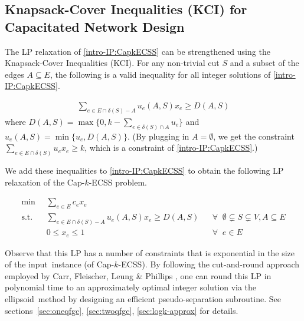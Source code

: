 \documentclass[11pt]{article}
\begin{document}
\subsection*{Knapsack-Cover Inequalities (KCI) for Capacitated Network Design}
{
The LP relaxation of \eqref{intro-IP:CapkECSS} can be strengthened
using the Knapsack-Cover Inequalities (KCI). For any non-trivial
cut $S$ and a subset of the edges $A\subseteq E$, the following is
a valid inequality for all integer solutions of \eqref{intro-IP:CapkECSS}.

\begin{align*}
        \sum_{e\in E\cap\delta(S) - A} u_e(A,S) x_e \geq D(A,S)
\end{align*}
where $D(A,S) = \max\{0,k - \sum_{e\in \delta(S)\cap A} u_e\}$ and
$u_e(A,S) = \min\{u_e,D(A,S)\}$.
(By plugging in $A=\emptyset$, we get the constraint
$\sum_{e\in E\cap\delta(S)} u_e x_e \geq k$,
which is a constraint of \eqref{intro-IP:CapkECSS}.)

We add these inequalities to \eqref{intro-IP:CapkECSS} to obtain the
following LP relaxation of the Cap-$k$-ECSS problem.

\begin{align*}\label{intro-KCLP:CapkECSS}
    \min\;\;&\sum_{e\in E}c_e x_e \tag{KCLP:~CapkECSS}\\
    \text{s.t.}\;\;& \sum_{e\in E\cap\delta(S) - A} u_e(A,S) x_e \geq D(A,S) && \forall\;\; \emptyset\subsetneq S\subsetneq V, A\subseteq E \\
    &0 \leq x_e \leq 1 && \forall\;\; e\in E
\end{align*}

Observe that this LP has a number of constraints that is exponential
in the size of the input~instance (of Cap-$k$-ECSS).
By following the cut-and-round approach employed by
Carr, Fleischer, Leung \& Phillips \cite{CFLP00},
one can round this LP in polynomial time
to an approximately optimal integer solution
via the ellipsoid~method by designing an efficient pseudo-separation subroutine.
See sections~\ref{sec:oneqfgc}, \ref{sec:twoqfgc}, \ref{sec:logk-approx} for details.
}
\end{document}
